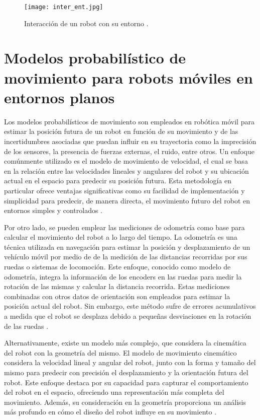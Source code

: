 \begin{figure}[H]
	\centering
	\texttt{[image: inter\_ent.jpg]}
	\caption{Interacción de un robot con su entorno \cite{thrun_probabilistic_2005}.}
	\label{fig:interaccion_ent}
\end{figure}

\section{Modelos probabilístico de movimiento para robots móviles en entornos planos}
Los modelos probabilísticos de movimiento son empleados en robótica móvil para estimar la posición futura de un robot en función de su movimiento y de las incertidumbres asociadas que puedan influir en su trayectoria como la imprecisión de los sensores, la presencia de fuerzas externas, el ruido, entre otros. Un enfoque comúnmente utilizado es el modelo de movimiento de velocidad, el cual se basa en la relación entre las velocidades lineales y angulares del robot y su ubicación actual en el espacio para predecir su posición futura. Esta metodología en particular ofrece ventajas significativas como su facilidad de implementación y simplicidad para predecir, de manera directa, el movimiento futuro del robot en entornos simples y controlados \cite{thrun_probabilistic_2005}.

Por otro lado, se pueden emplear las mediciones de odometría como base para calcular el movimiento del robot a lo largo del tiempo. La odometría es una técnica utilizada en navegación para estimar la posición y desplazamiento de un vehículo móvil por medio de de la medición de las distancias recorridas por sus ruedas o sistemas de locomoción. Este enfoque, conocido como modelo de odometría, integra la información de los encoders en las ruedas para medir la rotación de las mismas y calcular la distancia recorrida. Estas mediciones combinadas con otros datos de orientación son empleados para estimar la posición actual del robot. Sin embargo, este método sufre de errores acumulativos a medida que el robot se desplaza debido a pequeñas desviaciones en la rotación de las ruedas \cite{thrun_probabilistic_2005}. 

Alternativamente, existe un modelo más complejo, que considera la cinemática del robot con la geometría del mismo. El modelo de movimiento cinemático considera la velocidad lineal y angular del robot, junto con la forma y tamaño del mismo para predecir con precisión el desplazamiento y la orientación futura del robot. Este enfoque destaca por su capacidad para capturar el comportamiento del robot en el espacio, ofreciendo una representación más completa del movimiento. Además, su consideración en la geometría proporciona un análisis más profundo en cómo el diseño del robot influye en su movimiento \cite{fahimi_autonomous_2009}.

